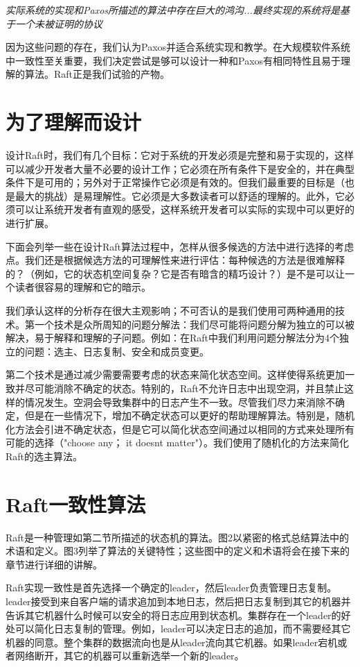 \documentclass[journal]{IEEEtran}
\begin{document}
\textit{实际系统的实现和Paxos所描述的算法中存在巨大的鸿沟...最终实现的系统将是基于一个未被证明的协议}


因为这些问题的存在，我们认为Paxos并适合系统实现和教学。在大规模软件系统中一致性至关重要，我们决定尝试是够可以设计一种和Paxos有相同特性且易于理解的算法。Raft正是我们试验的产物。




\section{为了理解而设计}
设计Raft时，我们有几个目标：它对于系统的开发必须是完整和易于实现的，这样可以减少开发者大量不必要的设计工作；它必须在所有条件下是安全的，并在典型条件下是可用的；另外对于正常操作它必须是有效的。但我们最重要的目标是（也是最大的挑战）是易理解性。它必须是大多数读者可以舒适的理解的。此外，它必须可以让系统开发者有直观的感受，这样系统开发者可以实际的实现中可以更好的进行扩展。

下面会列举一些在设计Raft算法过程中，怎样从很多候选的方法中进行选择的考虑点。我们还是根据候选方法的可理解性来进行评估：每种候选的方法是很难解释的？（例如，它的状态机空间复杂？它是否有暗含的精巧设计？）是不是可以让一个读者很容易的理解和它的暗示。


我们承认这样的分析存在很大主观影响；不可否认的是我们使用可两种通用的技术。第一个技术是众所周知的问题分解法：我们尽可能将问题分解为独立的可以被解决，易于解释和理解的子问题。例如：在Raft中我们利用问题分解法分为4个独立的问题：选主、日志复制、安全和成员变更。


第二个技术是通过减少需要需要考虑的状态来简化状态空间。这样使得系统更加一致并尽可能消除不确定的状态。特别的，Raft不允许日志中出现空洞，并且禁止这样的情况发生。空洞会导致集群中的日志产生不一致。尽管我们尽力来消除不确定，但是在一些情况下，增加不确定状态可以更好的帮助理解算法。特别是，随机化方法会引进不确定状态，但是它可以简化状态空间通过以相同的方式来处理所有可能的选择（"choose any； it doesnt matter"）。我们使用了随机化的方法来简化Raft的选主算法。


\section{Raft一致性算法}
Raft是一种管理如第二节所描述的状态机的算法。图2以紧密的格式总结算法中的术语和定义。图3列举了算法的关键特性；这些图中的定义和术语将会在接下来的章节进行详细的讲解。


Raft实现一致性是首先选择一个确定的leader，然后leader负责管理日志复制。leader接受到来自客户端的请求追加到本地日志，然后把日志复制到其它的机器并告诉其它机器什么时候可以安全的将日志应用到状态机。集群存在一个leader的好处可以简化日志复制的管理。例如，leader可以决定日志的追加，而不需要经其它机器的同意。整个集群的数据流向也是从leader流向其它机器。如果leader宕机或者网络断开，其它的机器可以重新选举一个新的leader。
\end{document}
